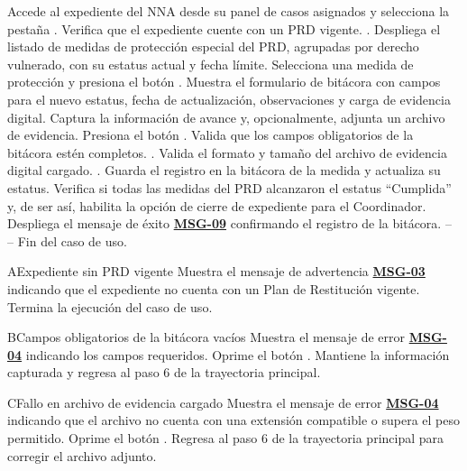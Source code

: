 \begin{UCtrayectoria}
	\UCpaso[\UCactor] Accede al expediente del NNA desde su panel de casos asignados y selecciona la pestaña .
	\UCpaso Verifica que el expediente cuente con un PRD vigente. .
	\UCpaso Despliega el listado de medidas de protección especial del PRD, agrupadas por derecho vulnerado, con su estatus actual y fecha límite.
	\UCpaso[\UCactor] Selecciona una medida de protección y presiona el botón .
	\UCpaso Muestra el formulario de bitácora con campos para el nuevo estatus, fecha de actualización, observaciones y carga de evidencia digital.
	\UCpaso[\UCactor] Captura la información de avance y, opcionalmente, adjunta un archivo de evidencia.
	\UCpaso[\UCactor] Presiona el botón .
	\UCpaso Valida que los campos obligatorios de la bitácora estén completos. .
	\UCpaso Valida el formato y tamaño del archivo de evidencia digital cargado. .
	\UCpaso Guarda el registro en la bitácora de la medida y actualiza su estatus.
	\UCpaso Verifica si todas las medidas del PRD alcanzaron el estatus ``Cumplida'' y, de ser así, habilita la opción de cierre de expediente para el Coordinador.
	\UCpaso Despliega el mensaje de éxito \hyperlink{mMSG09}{\bf MSG-09} confirmando el registro de la bitácora.
	\UCpaso[] -- -- Fin del caso de uso.
\end{UCtrayectoria}

\begin{UCtrayectoriaA}{A}{Expediente sin PRD vigente}
	\UCpaso Muestra el mensaje de advertencia \hyperlink{mMSG03}{\bf MSG-03} indicando que el expediente no cuenta con un Plan de Restitución vigente.
	\UCpaso Termina la ejecución del caso de uso.
\end{UCtrayectoriaA}

\begin{UCtrayectoriaA}{B}{Campos obligatorios de la bitácora vacíos}
	\UCpaso Muestra el mensaje de error \hyperlink{mMSG04}{\bf MSG-04} indicando los campos requeridos.
	\UCpaso[\UCactor] Oprime el botón .
	\UCpaso Mantiene la información capturada y regresa al paso 6 de la trayectoria principal.
\end{UCtrayectoriaA}

\begin{UCtrayectoriaA}{C}{Fallo en archivo de evidencia cargado}
	\UCpaso Muestra el mensaje de error \hyperlink{mMSG04}{\bf MSG-04} indicando que el archivo no cuenta con una extensión compatible o supera el peso permitido.
	\UCpaso[\UCactor] Oprime el botón .
	\UCpaso Regresa al paso 6 de la trayectoria principal para corregir el archivo adjunto.
\end{UCtrayectoriaA}
